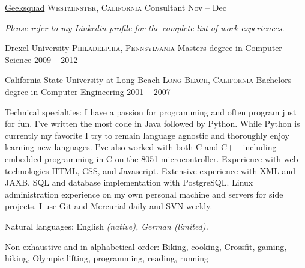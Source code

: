 \documentclass[10pt,a4paper]{article}
\begin{document}
\headedsection
  {\href{http://www.geeksquad.com/}{Geeksquad}}
  {\textsc{Westminster, California}} {%
  \headedsubsection
  { Consultant}
    {Nov -- Dec}
    {}
}

\begin{center}
  \emph{Please refer to \href{http://www.linkedin.com/in/marcusmccurdy}{my Linkedin profile} for the complete list of work experiences.}
\end{center}


\spacedhrule{-0.2em}{-0.4em}


\headedsection
  {Drexel University}
  {\textsc{Philadelphia, Pennsylvania}} {%
  \headedsubsection
    {Masters degree in Computer Science}
    {2009 -- 2012}
    {}
}

\headedsection
  {California State University at Long Beach}
  {\textsc{Long Beach, California}} {%
  \headedsubsection
    {Bachelors degree in Computer Engineering}
    {2001 -- 2007} 
    {}
}

\spacedhrule{0.5em}{-0.4em}


\inlineheadsection  %
  {Technical specialties:}
  {I have a passion for programming and often program just for fun. I've written the
  most code in Java followed by Python. While Python is currently my favorite
  I try to remain language agnostic and thoroughly enjoy learning new
  languages. I've also worked with both C and C++ including embedded programming
  in C on the 8051 microcontroller. Experience with web 
  technologies {HTML}, {CSS}, and {Javascript}. Extensive experience with
  {XML} and {JAXB}. {SQL} and database implementation with {PostgreSQL}. 
  Linux administration experience on my own personal machine and servers for 
  side projects. I use Git and Mercurial daily and {SVN} weekly.}

\inlineheadsection
  {Natural languages:}
  {English \emph{(native), German \emph{(limited)}.}}


\spacedhrule{1.6em}{-0.4em}


\inlineheadsection
  {Non-exhaustive and in alphabetical order:}
  {Biking, cooking, Crossfit, gaming, hiking, Olympic lifting, programming, reading, running}
\end{document}
